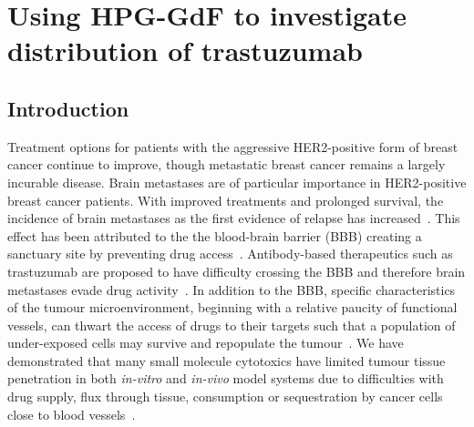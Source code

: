 
\chapter{Using \acs{HPG-GdF} to investigate distribution of trastuzumab}
\label{ch:HPG2}


\section{Introduction}

Treatment options for patients with the aggressive \acs{HER2}-positive form of breast cancer continue to improve, though metastatic breast cancer remains a largely incurable disease.
Brain metastases are of particular importance in \acs{HER2}-positive breast cancer patients.
With improved treatments and prolonged survival, the incidence of brain metastases as the first evidence of relapse has increased~\cite{Seal:2012cn,Bria:2007gc}.
This effect has been attributed to the the blood-brain barrier (\acs{BBB}) creating a sanctuary site by preventing drug access~\cite{Kaplan:2014es,Lai:2004bd}.
Antibody-based therapeutics such as trastuzumab are proposed to have difficulty crossing the \acs{BBB} and therefore brain metastases evade drug activity~\cite{Seal:2012cn,Murrell:2015bz,Stemmler:2006}.
In addition to the \acs{BBB}, specific characteristics of the tumour microenvironment, beginning with a relative paucity of functional vessels, can thwart the access of drugs to their targets such that a population of under-exposed cells may survive and repopulate the tumour~\cite{Minchinton:2006gs}.
We have demonstrated that many small molecule cytotoxics have limited tumour tissue penetration in both \emph{in-vitro} and \emph{in-vivo} model systems due to difficulties with drug supply, flux through tissue, consumption or sequestration by cancer cells close to blood vessels~\cite{Kyle:2014cy,Kyle:2007ch,Huxham:2004hm,Kyle:2004fo,Kyle:1999kr}.

